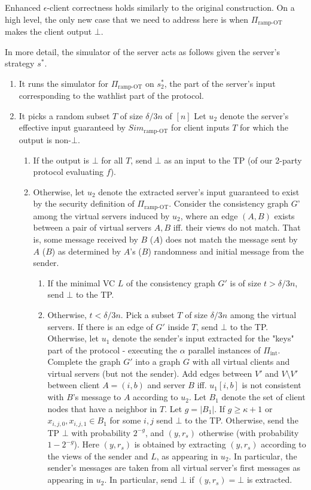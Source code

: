 \documentclass[a4paper]{article}
\newcommand{\INT}{\Pi_{\text{int}}}
\begin{document}
Enhanced $\epsilon$-client correctness holds similarly to the original construction. On a high level, the only new case that we need to address here is when $\Pi_{\text{ramp-OT}}$ makes the client output $\bot$.

In more detail, the simulator of the server acts as follows given the server's strategy $s^*$.
\begin{enumerate}
	\item It runs the simulator for $\Pi_{\text{ramp-OT}}$ on $s^*_2$, the part of the server's input corresponding to the wathlist part of the protocol.
	\item It picks a random  subset $T$ of size $\delta/3 n$ of $[n]$ Let $u_2$ denote the server's effective input guaranteed by $Sim_{\text{ramp-OT}}$ for client inputs $T$ for which the output is non-$\bot$. 
	\begin{enumerate}
	\item If the output is $\bot$ for all $T$, send $\bot$ as an input to the TP (of our 2-party protocol evaluating $f$).
	\item Otherwise, let $u_2$ denote the extracted server's input guaranteed to exist by the security definition of $\Pi_{\text{ramp-OT}}$.
	Consider the consistency graph $G$' among the virtual servers induced by $u_2$, where an edge $(A,B)$ exists between a pair of virtual servers $A,B$ iff. their views do not match. That is, some message received by $B$ ($A$) does not match the message sent by $A$ ($B$) as determined by $A$'s ($B$) randomness and initial message from the sender.
	\begin{enumerate}
		\item If the minimal VC $L$ of the consistency graph $G'$ is of size $t>\delta/3 n$, send $\bot$ to the TP.
		\item Otherwise, $t<\delta/3 n$. Pick a subset $T$ of size $\delta/3 n$ among the virtual servers. If there is an edge of $G'$ inside $T$, send $\bot$ to the TP. Otherwise, let $u_1$ denote the sender's input extracted for the "keys" part of the protocol - executing the $\alpha$ parallel instances of $\INT$. 
		Complete the graph $G'$ into a graph $G$ with all virtual clients and virtual servers (but not the sender). Add edges between $V'$ and $V\setminus{V'}$ between client $A=(i,b)$ and server $B$ iff. $u_1[i,b]$ is not consistent with $B$'s message to $A$ according to $u_2$. 
		Let $B_1$ denote the set of client nodes that have a neighbor in $T$. Let $g=|B_1|$. If $g\geq \kappa+1$ or $x_{i,j,0},x_{i,j,1}\in B_1$ for some $i,j$ send $\bot$ to the TP. Otherwise, send the TP $\bot$ with probability $2^{-g}$, and $(y,r_s)$ otherwise (with probability $1-2^{-g}$). Here $(y,r_s)$ is obtained by extracting $(y,r_s)$ according to the views of the sender and $L$, as appearing in $u_2$. In particular, the sender's messages are taken from all virtual server's first messages as appearing in $u_2$. In particular, send $\bot$ if $(y,r_s)=\bot$ is extracted.

\end{enumerate}
\end{enumerate}
\end{enumerate}
\end{document}
